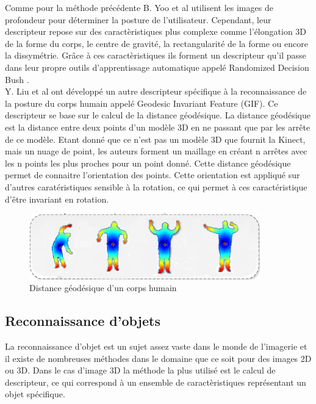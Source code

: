 Comme pour la méthode précédente B. Yoo et al\cite{RDB} utilisent les images de profondeur pour déterminer
la posture de l'utilisateur. Cependant, leur descripteur repose sur des caractèristiques plus complexe comme
l'élongation 3D de la forme du corps, le centre de gravité, la rectangularité de la forme ou encore la 
dissymétrie. Grâce à ces caractèristiques ils forment un descripteur qu'il passe dans leur propre outils
d'apprentissage automatique appelé \og Randomized Decision Bush \fg.\\

Y. Liu et al\cite{GIF} ont développé un autre descripteur spécifique à la reconnaissance de la posture du corps
humain appelé \og Geodesic Invariant Feature \fg(GIF). 
Ce descripteur se base sur le calcul de la distance géodésique. La distance géodésique est la distance
entre deux points d'un modèle 3D en ne passant que par les arrête de ce modèle. Etant donné que ce n'est pas un
modèle 3D que fournit la Kinect, mais un nuage de point, les auteurs forment un maillage en créant n arrêtes avec
les n points les plus proches pour un point donné. Cette distance géodésique permet de connaitre l'orientation
des points. Cette orientation est appliqué sur d'autres caratéristiques sensible à la rotation, ce qui permet
à ces caractéristique d'être invariant en rotation. 

\begin{figure}[!ht]
  \begin{center}
    \includegraphics[width=10cm]{image/geodesic.png}
    \caption{Distance géodésique d'un corps humain}
  \end{center}
\end{figure}

\subsection{Reconnaissance d'objets}
La reconnaissance d'objet est un sujet assez vaste dans le monde de l'imagerie et il existe de nombreuses
méthodes dans le domaine que ce soit pour des images 2D ou 3D. Dans le cas d'image 3D la méthode la plus utilisé
est le calcul de descripteur, ce qui correspond à un ensemble de caractèristiques représentant un objet spécifique.

